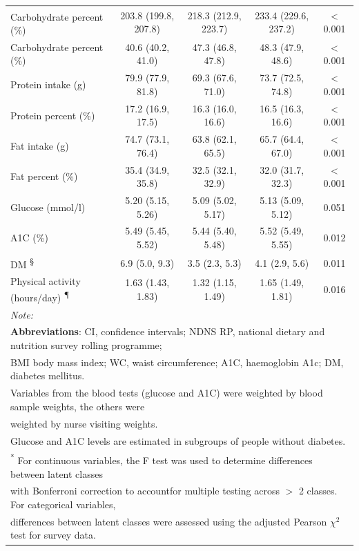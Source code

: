 \begin{table}[H]
\begin{tabular}[t]{lcccc}
		Carbohydrate percent\textsuperscript{\ddag} (\%) & 203.8 (199.8, 207.8) & 218.3 (212.9, 223.7) & 233.4 (229.6, 237.2) & < 0.001\\
		Carbohydrate percent (\%) & 40.6 (40.2, 41.0) & 47.3 (46.8, 47.8) & 48.3 (47.9, 48.6) & < 0.001\\
		Protein intake (g) & 79.9 (77.9, 81.8) & 69.3 (67.6, 71.0) & 73.7 (72.5, 74.8) & < 0.001\\
		Protein percent (\%) & 17.2 (16.9, 17.5) & 16.3 (16.0, 16.6) & 16.5 (16.3, 16.6) & < 0.001\\
		Fat intake (g) & 74.7 (73.1, 76.4) & 63.8 (62.1, 65.5) & 65.7 (64.4, 67.0) & < 0.001\\
		Fat percent (\%) & 35.4 (34.9, 35.8) & 32.5 (32.1, 32.9) & 32.0 (31.7, 32.3) & < 0.001\\
		Glucose (mmol/l) & 5.20 (5.15, 5.26) & 5.09 (5.02, 5.17) & 5.13 (5.09, 5.12) & 0.051\\
		A1C (\%) & 5.49 (5.45, 5.52) & 5.44 (5.40, 5.48) & 5.52 (5.49, 5.55) & 0.012\\
		DM \textsuperscript{\S} & 6.9 (5.0, 9.3) & 3.5 (2.3, 5.3) & 4.1 (2.9, 5.6) & 0.011\\
		Physical
		activity (hours/day) \textsuperscript{\P} & 1.63 (1.43, 1.83) & 1.32 (1.15, 1.49) & 1.65 (1.49, 1.81) & 0.016\\
		\bottomrule
		\multicolumn{5}{l}{\textit{Note: }}\\
		\multicolumn{5}{l}{\textbf{Abbreviations}: CI, confidence intervals; NDNS RP, national dietary and nutrition survey rolling programme;}\\
		\multicolumn{5}{l}{ BMI body mass index; WC, waist circumference; A1C, haemoglobin A1c; DM, diabetes mellitus.}\\
		\multicolumn{5}{l}{Variables from the blood tests (glucose and A1C) were weighted by blood sample weights, the others were}\\ 
		\multicolumn{5}{l}{weighted by nurse visiting weights.}\\
		\multicolumn{5}{l}{Glucose and A1C levels are estimated in subgroups of people without diabetes.}\\
		\multicolumn{5}{l}{\textsuperscript{*} For continuous variables, the F test was used to determine differences between latent classes}\\ 
		\multicolumn{5}{l}{with Bonferroni correction to accountfor multiple testing across $>$ 2 classes. For categorical variables, }\\
		\multicolumn{5}{l}{differences between latent classes were assessed using the adjusted Pearson $\chi^2$ test for survey data.}\\ 

\end{tabular}
\end{table}
